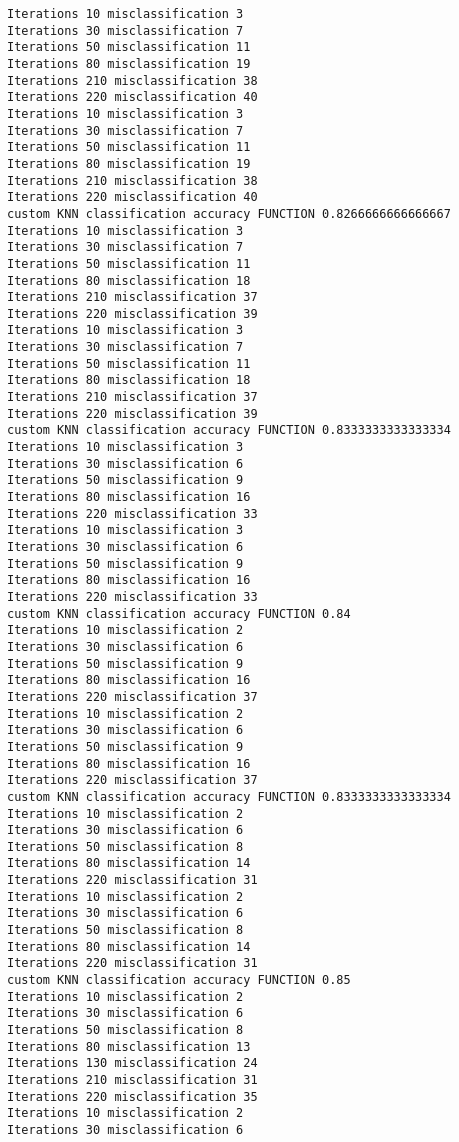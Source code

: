 \documentclass[11pt]{article}
\begin{document}
    \begin{Verbatim}[commandchars=\\\{\}]
Iterations 10 misclassification 3
Iterations 30 misclassification 7
Iterations 50 misclassification 11
Iterations 80 misclassification 19
Iterations 210 misclassification 38
Iterations 220 misclassification 40
Iterations 10 misclassification 3
Iterations 30 misclassification 7
Iterations 50 misclassification 11
Iterations 80 misclassification 19
Iterations 210 misclassification 38
Iterations 220 misclassification 40
custom KNN classification accuracy FUNCTION 0.8266666666666667
Iterations 10 misclassification 3
Iterations 30 misclassification 7
Iterations 50 misclassification 11
Iterations 80 misclassification 18
Iterations 210 misclassification 37
Iterations 220 misclassification 39
Iterations 10 misclassification 3
Iterations 30 misclassification 7
Iterations 50 misclassification 11
Iterations 80 misclassification 18
Iterations 210 misclassification 37
Iterations 220 misclassification 39
custom KNN classification accuracy FUNCTION 0.8333333333333334
Iterations 10 misclassification 3
Iterations 30 misclassification 6
Iterations 50 misclassification 9
Iterations 80 misclassification 16
Iterations 220 misclassification 33
Iterations 10 misclassification 3
Iterations 30 misclassification 6
Iterations 50 misclassification 9
Iterations 80 misclassification 16
Iterations 220 misclassification 33
custom KNN classification accuracy FUNCTION 0.84
Iterations 10 misclassification 2
Iterations 30 misclassification 6
Iterations 50 misclassification 9
Iterations 80 misclassification 16
Iterations 220 misclassification 37
Iterations 10 misclassification 2
Iterations 30 misclassification 6
Iterations 50 misclassification 9
Iterations 80 misclassification 16
Iterations 220 misclassification 37
custom KNN classification accuracy FUNCTION 0.8333333333333334
Iterations 10 misclassification 2
Iterations 30 misclassification 6
Iterations 50 misclassification 8
Iterations 80 misclassification 14
Iterations 220 misclassification 31
Iterations 10 misclassification 2
Iterations 30 misclassification 6
Iterations 50 misclassification 8
Iterations 80 misclassification 14
Iterations 220 misclassification 31
custom KNN classification accuracy FUNCTION 0.85
Iterations 10 misclassification 2
Iterations 30 misclassification 6
Iterations 50 misclassification 8
Iterations 80 misclassification 13
Iterations 130 misclassification 24
Iterations 210 misclassification 31
Iterations 220 misclassification 35
Iterations 10 misclassification 2
Iterations 30 misclassification 6

\end{Verbatim}
\end{document}
